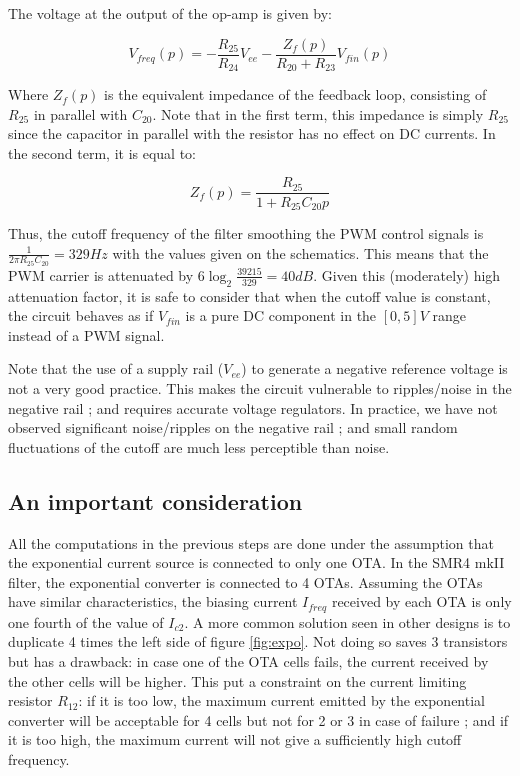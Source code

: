 \documentclass[a4paper,11pt]{article}
\begin{document}
The voltage at the output of the op-amp is given by:

\begin{equation}
V_{freq}(p) = -\frac{R_{25}}{R_{24}} V_{ee} -\frac{Z_f(p)}{R_{20} + R_{23}} V_{fin}(p)
\end{equation}

Where $Z_f(p)$ is the equivalent impedance of the feedback loop, consisting of $R_{25}$ in parallel with $C_{20}$. Note that in the first term, this impedance is simply $R_{25}$ since the capacitor in parallel with the resistor has no effect on DC currents. In the second term, it is equal to:

\begin{equation}
Z_f(p) = \frac{R_{25}}{1 + R_{25}C_{20}p}
\end{equation}

Thus, the cutoff frequency of the filter smoothing the PWM control signals is $\frac{1}{2 \pi R_{25}C_{20}} = 329 Hz$ with the values given on the schematics. This means that the PWM carrier is attenuated by $6\log_2 \frac{39215}{329} = 40dB$. Given this (moderately) high attenuation factor, it is safe to consider that when the cutoff value is constant, the circuit behaves as if $V_{fin}$ is a pure DC component in the $[0, 5]V$ range instead of a PWM signal.

Note that the use of a supply rail ($V_{ee}$) to generate a negative reference voltage is not a very good practice. This makes the circuit vulnerable to ripples/noise in the negative rail ; and requires accurate voltage regulators. In practice, we have not observed significant noise/ripples on the negative rail ; and small random fluctuations of the cutoff are much less perceptible than noise.

\subsection{An important consideration}

All the computations in the previous steps are done under the assumption that the exponential current source is connected to only one OTA. In the SMR4 mkII filter, the exponential converter is connected to 4 OTAs. Assuming the OTAs have similar characteristics, the biasing current $I_{freq}$ received by each OTA is only one fourth of the value of $I_{c2}$. A more common solution seen in other designs is to duplicate 4 times the left side of figure \ref{fig:expo}. Not doing so saves 3 transistors but has a drawback: in case one of the OTA cells fails, the current received by the other cells will be higher. This put a constraint on the current limiting resistor $R_{12}$: if it is too low, the maximum current emitted by the exponential converter will be acceptable for 4 cells but not for 2 or 3 in case of failure ; and if it is too high, the maximum current will not give a sufficiently high cutoff frequency.
\end{document}
